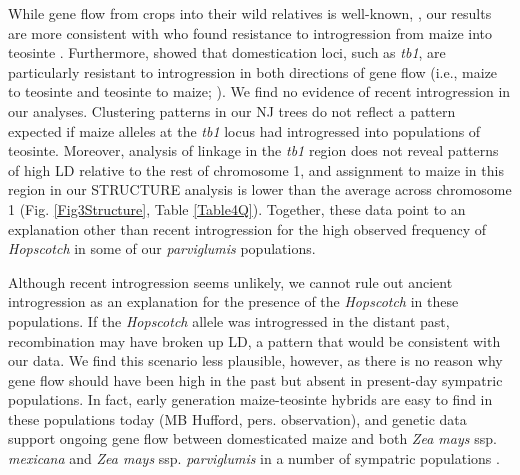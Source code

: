 \documentclass[11pt]{article}
\begin{document}
\begin{linenumbers}
\begin{flushleft}
While gene flow from crops into their wild relatives is well-known, \citep{Ellstrand1999, Zhang2009, Thurber2010, Baack2008, Hubner2012, Wilkes1977, VanHeerwaarden2011, Barrett1983}, our results are more consistent with \citet{Hufford2013} who found resistance to introgression from maize into teosinte \citep{Hufford2013}. Furthermore, \citet{Hufford2013} showed that domestication loci, such as \emph{tb1}, are particularly resistant to introgression in both directions of gene flow (i.e., maize to teosinte and teosinte to maize; \citealt{Hufford2013}). We find no evidence of recent introgression in our analyses. Clustering patterns in our NJ trees do not reflect a pattern expected if maize alleles at the \emph{tb1} locus had introgressed into populations of teosinte.  Moreover, analysis of linkage in the \emph{tb1} region does not reveal patterns of high LD relative to the rest of chromosome 1, and assignment to maize in this region in our STRUCTURE analysis is lower than the average across chromosome 1 (Fig. \ref{Fig3Structure}, Table \ref{Table4Q}). Together, these data point to an explanation other than recent introgression for the high observed frequency of \emph{Hopscotch} in some of  our \emph{parviglumis} populations.

Although recent introgression seems unlikely, we cannot rule out ancient introgression as an explanation for the presence of the \emph{Hopscotch} in these populations. If the \emph{Hopscotch} allele was introgressed in the distant past, recombination may have broken up LD, a pattern that would be consistent with our data.  We find this scenario less plausible, however, as there is no reason why gene flow should have been high in the past but absent in present-day sympatric populations.  In fact, early generation maize-teosinte hybrids are easy to find in these populations today (MB Hufford, pers. observation), and genetic data support ongoing gene flow between domesticated maize and both \emph{Zea mays} ssp. \emph{mexicana} and \emph{Zea mays} ssp. \emph{parviglumis} in a number of sympatric populations \citep{Hufford2013, Ellstrand2007, VanHeerwaarden2011}. 


\end{flushleft}
\end{linenumbers}
\end{document}
